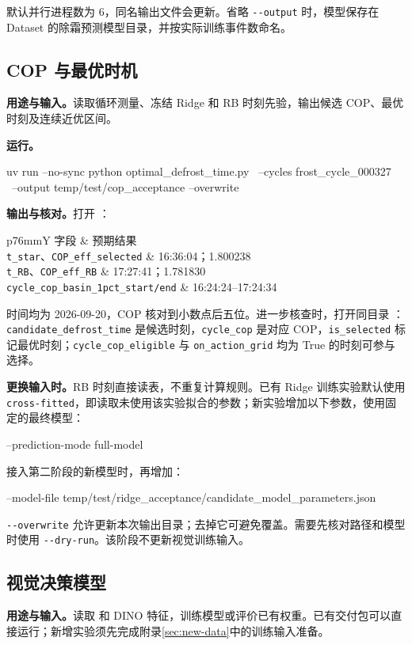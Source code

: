 \documentclass[UTF8,11pt,a4paper,fontset=fandol]{ctexart}
\newcommand{\code}[1]{\nolinkurl{#1}}
\begin{document}
默认并行进程数为 6，同名输出文件会更新。省略 \code{--output} 时，模型保存在 Dataset 的除霜预测模型目录，并按实际训练事件数命名。

\subsection{COP 与最优时机}
\label{sec:cop}
\textbf{用途与输入。}读取循环测量、冻结 Ridge 和 RB 时刻先验，输出候选 COP、最优时刻及连续近优区间。

\textbf{运行。}
\begin{Code}
uv run --no-sync python optimal_defrost_time.py \
  --cycles frost_cycle_000327 \
  --output temp/test/cop_acceptance --overwrite
\end{Code}
\textbf{输出与核对。}打开 ：
\begin{center}
\begin{tabularx}{\textwidth}{p{76mm}Y}
\toprule
字段 & 预期结果 \\
\midrule
\code{t_star}、\code{COP_eff_selected} & 16:36:04；1.800238 \\
\code{t_RB}、\code{COP_eff_RB} & 17:27:41；1.781830 \\
\code{cycle_cop_basin_1pct_start/end} & 16:24:24--17:24:34 \\
\bottomrule
\end{tabularx}
\end{center}
时间均为 2026-09-20，COP 核对到小数点后五位。进一步核查时，打开同目录 ：\code{candidate_defrost_time} 是候选时刻，\code{cycle_cop} 是对应 COP，\code{is_selected} 标记最优时刻；\code{cycle_cop_eligible} 与 \code{on_action_grid} 均为 True 的时刻可参与选择。

\textbf{更换输入时。}RB 时刻直接读表，不重复计算规则。已有 Ridge 训练实验默认使用 \code{cross-fitted}，即读取未使用该实验拟合的参数；新实验增加以下参数，使用固定的最终模型：
\begin{Code}
--prediction-mode full-model
\end{Code}
接入第二阶段的新模型时，再增加：
\begin{Code}
--model-file temp/test/ridge_acceptance/candidate_model_parameters.json
\end{Code}
\code{--overwrite} 允许更新本次输出目录；去掉它可避免覆盖。需要先核对路径和模型时使用 \code{--dry-run}。该阶段不更新视觉训练输入。

\subsection{视觉决策模型}
\label{sec:visual}
\textbf{用途与输入。}读取  和 DINO 特征，训练模型或评价已有权重。已有交付包可以直接运行；新增实验须先完成附录\ref{sec:new-data}中的训练输入准备。
\end{document}
